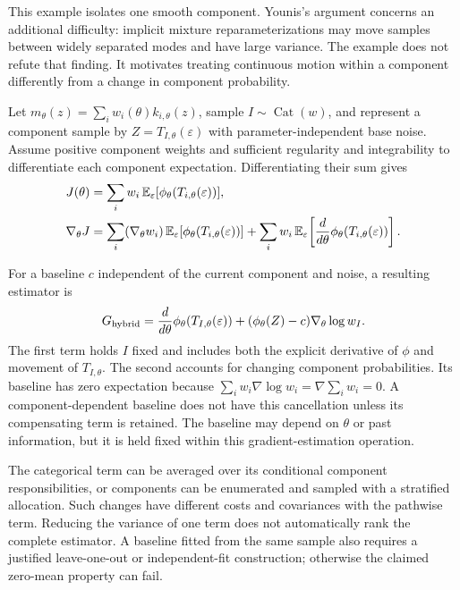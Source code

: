 \documentclass[11pt]{article}
\begin{document}
This example isolates one smooth component. Younis's argument concerns an
additional difficulty: implicit mixture reparameterizations may move samples
between widely separated modes and have large variance. The example does
not refute that finding. It motivates treating continuous motion within a
component differently from a change in component probability.

\begin{samepage}
Let $m_\theta(z)=\sum_iw_i(\theta)k_{i,\theta}(z)$, sample
$I\sim\operatorname{Cat}(w)$, and represent a component sample by
$Z=T_{I,\theta}(\varepsilon)$ with parameter-independent base noise.
Assume positive component weights and sufficient regularity and integrability
to differentiate each component expectation. Differentiating their sum gives
\begin{align}
 J(\theta)&=\sum_iw_i\,
             \mathbb E_\varepsilon[\phi_\theta(T_{i,\theta}(\varepsilon))],
 \notag\\
 \nabla_\theta J
 &=\sum_i(\nabla_\theta w_i)\,
             \mathbb E_\varepsilon[\phi_\theta(T_{i,\theta}(\varepsilon))]
   +\sum_iw_i\,
             \mathbb E_\varepsilon\!\left[
                 \frac{d}{d\theta}\phi_\theta(T_{i,\theta}(\varepsilon))
             \right].
 \label{eq:hybrid-component-derivation}
\end{align}
\end{samepage}
For a baseline $c$ independent of the current component and noise, a resulting
estimator is
\begin{equation}
 G_{\rm hybrid}
 =\frac{d}{d\theta}\phi_\theta(T_{I,\theta}(\varepsilon))
  +(\phi_\theta(Z)-c)\nabla_\theta\log w_I.
 \label{eq:hybrid-estimator}
\end{equation}
The first term holds $I$ fixed and includes both the explicit derivative of
$\phi$ and movement of $T_{I,\theta}$. The second accounts for changing
component probabilities. Its baseline has zero expectation because
$\sum_iw_i\nabla\log w_i=\nabla\sum_iw_i=0$. A component-dependent baseline
does not have this cancellation unless its compensating term is retained.
The baseline may depend on $\theta$ or past information, but it is held fixed
within this gradient-estimation operation.

The categorical term can be averaged over its conditional component
responsibilities, or components can be enumerated and sampled with a
stratified allocation. Such changes have different costs and covariances with
the pathwise term. Reducing the variance of one term does not automatically
rank the complete estimator. A baseline fitted from the same sample also
requires a justified leave-one-out or independent-fit construction; otherwise
the claimed zero-mean property can fail.
\end{document}
